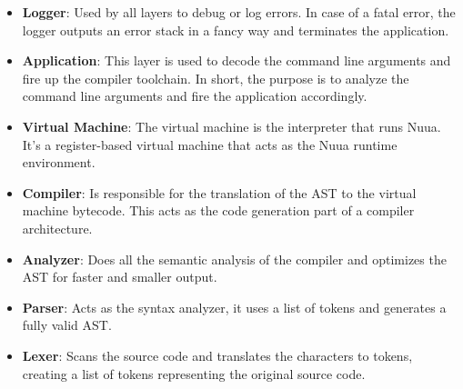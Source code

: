 \begin{itemize}
    \item \textbf{Logger}: Used by all layers to debug or log errors. In case of a fatal error, the logger outputs
        an error stack in a fancy way and terminates the application.
    \item \textbf{Application}: This layer is used to decode the command line arguments and fire up the compiler toolchain. In short,
        the purpose is to analyze the command line arguments and fire the application accordingly.
    \item \textbf{Virtual Machine}: The virtual machine is the interpreter that runs Nuua. It's a register-based virtual machine that
        acts as the Nuua runtime environment.
    \item \textbf{Compiler}: Is responsible for the translation of the AST to the virtual machine bytecode. This acts as the code generation
        part of a compiler architecture.
    \item \textbf{Analyzer}: Does all the semantic analysis of the compiler and optimizes the AST for faster and smaller output.
    \item \textbf{Parser}: Acts as the syntax analyzer, it uses a list of tokens and generates a fully valid AST.
    \item \textbf{Lexer}: Scans the source code and translates the characters to tokens, creating a list of tokens representing
        the original source code.
\end{itemize}
